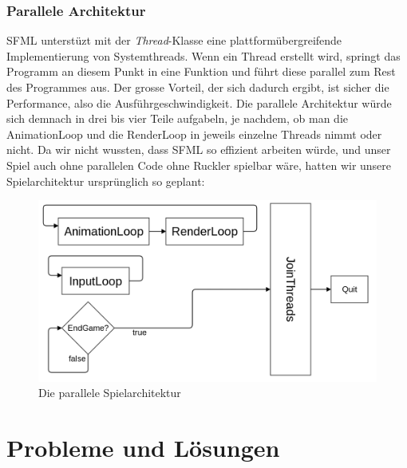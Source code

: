 \documentclass[11pt,a4paper]{scrbook}
\begin{document}
\subsection{Parallele Architektur}
SFML unterstüzt mit der \textit{Thread}-Klasse eine plattformübergreifende Implementierung
von Systemthreads. Wenn ein Thread erstellt wird, springt das Programm an diesem Punkt
in eine Funktion und führt diese parallel zum Rest des Programmes aus. Der grosse Vorteil,
der sich dadurch ergibt, ist sicher die Performance, also die Ausführgeschwindigkeit. Die
parallele Architektur würde sich demnach in drei bis vier Teile aufgabeln, je nachdem, ob man die AnimationLoop
und die RenderLoop in jeweils einzelne Threads nimmt oder nicht. Da wir
nicht wussten, dass SFML so effizient arbeiten würde, und unser Spiel auch ohne parallelen Code
ohne Ruckler spielbar wäre, hatten wir unsere Spielarchitektur ursprünglich so geplant:
\\
\begin{figure}[h]
\centering
\includegraphics[scale=0.3]{img/threads.png}
\caption{Die parallele Spielarchitektur}
\end{figure}


\chapter{Probleme und Lösungen} 	
\end{document}
